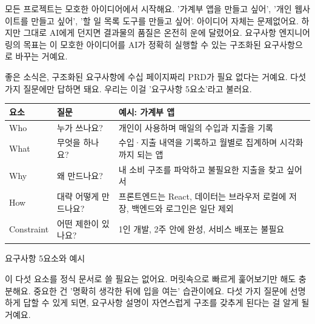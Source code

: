 


모든 프로젝트는 모호한 아이디어에서 시작해요. '가계부 앱을 만들고 싶어', '개인 웹사이트를 만들고 싶어', '할 일 목록 도구를 만들고 싶어'. 아이디어 자체는 문제없어요. 하지만 그대로 AI에게 던지면 결과물의 품질은 온전히 운에 달렸어요. 요구사항 엔지니어링의 목표는 이 모호한 아이디어를 AI가 정확히 실행할 수 있는 구조화된 요구사항으로 바꾸는 거예요.

좋은 소식은, 구조화된 요구사항에 수십 페이지짜리 PRD가 필요 없다는 거예요. 다섯 가지 질문에만 답하면 돼요. 우리는 이걸 '요구사항 5요소'라고 불러요.

\begin{center}
\begin{tabularx}{\linewidth}{|X|X|X|}
\hline
\textbf{요소} & \textbf{질문} & \textbf{예시: 가계부 앱} \tabularnewline
\hline
Who & 누가 쓰나요? & 개인이 사용하며 매일의 수입과 지출을 기록 \tabularnewline
What & 무엇을 하나요? & 수입·지출 내역을 기록하고 월별로 집계하며 시각화까지 되는 앱 \tabularnewline
Why & 왜 만드나요? & 내 소비 구조를 파악하고 불필요한 지출을 찾고 싶어서 \tabularnewline
How & 대략 어떻게 만드나요? & 프론트엔드는 React, 데이터는 브라우저 로컬에 저장, 백엔드와 로그인은 일단 제외 \tabularnewline
Constraint & 어떤 제한이 있나요? & 1인 개발, 2주 안에 완성, 서비스 배포는 불필요 \tabularnewline
\hline
\end{tabularx}
\end{center}

\begin{center}\small\color{gray}요구사항 5요소와 예시\end{center}

이 다섯 요소를 정식 문서로 쓸 필요는 없어요. 머릿속으로 빠르게 훑어보기만 해도 충분해요. 중요한 건 '명확히 생각한 뒤에 입을 여는' 습관이에요. 다섯 가지 질문에 선명하게 답할 수 있게 되면, 요구사항 설명이 자연스럽게 구조를 갖추게 된다는 걸 알게 될 거예요.


